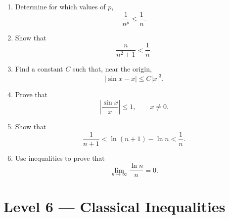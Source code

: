 \documentclass{essay}
\begin{document}
\begin{enumerate}[resume]

    \item Determine for which values of \(p\),
    \[
        \frac{1}{n^p}\le\frac{1}{n}.
    \]

    \item Show that
    \[
        \frac{n}{n^2+1}<\frac{1}{n}.
    \]

    \item Find a constant \(C\) such that, near the origin,
    \[
        |\sin x - x|
        \le
        C|x|^3.
    \]

    \item Prove that
    \[
        \left|\frac{\sin x}{x}\right|
        \le
        1,
        \qquad
        x\neq0.
    \]

    \item Show that
    \[
        \frac{1}{n+1}
        <
        \ln(n+1)-\ln n
        <
        \frac{1}{n}.
    \]

    \item Use inequalities to prove that
    \[
        \lim_{n\to\infty}\frac{\ln n}{n}=0.
    \]
\end{enumerate}

\section*{Level 6 --- Classical Inequalities}
\end{document}
